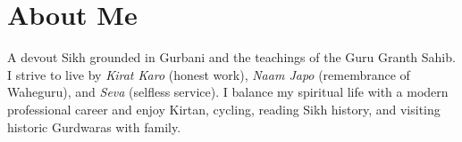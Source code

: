 \section{About Me}

A devout Sikh grounded in Gurbani and the teachings of the Guru Granth Sahib.
I strive to live by \textit{Kirat Karo} (honest work), \textit{Naam Japo}
(remembrance of Waheguru), and \textit{Seva} (selfless service). I balance my
spiritual life with a modern professional career and enjoy Kirtan, cycling,
reading Sikh history, and visiting historic Gurdwaras with family.

\vspace{2mm}

